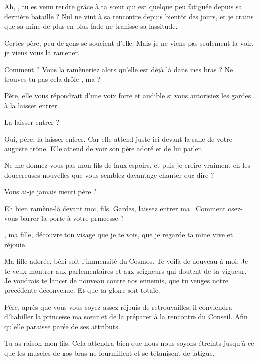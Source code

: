 \begin{drama}

  \roispeaks Ah, \elena, tu es venu rendre grâce à ta sœur qui est quelque peu fatiguée depuis sa dernière bataille ? Nul ne vint à sa rencontre depuis bientôt des jours, et je crains que sa mine de plus en plus fade ne trahisse sa lassitude.

  \elenaspeaks Certes père, peu de gens se soucient d’elle. Mais je ne viens pas seulement la voir, je viens vous la ramener.

  \roispeaks Comment ? Vous la ramèneriez alors qu’elle est déjà là dans mes bras  ?  Ne trouves-tu pas cela drôle \princesse{}, ma \princesse{} ?

  \elenaspeaks Père, elle vous répondrait d’une voix forte et audible si vous autorisiez les gardes à la laisser entrer.

  \elenaspeaks La laisser entrer ?

  \elenaspeaks Oui, père, la laisser entrer. Car elle attend juste ici devant la salle de votre auguste trône. Elle attend de voir son père adoré et de lui parler.


  \roispeaks Ne me donnez-vous pas mon fils de faux espoirs, et puis-je croire vraiment en les doucereuses nouvelles que vous semblez davantage chanter que dire ?

  \elenaspeaks Vous ai-je jamais menti père ?

  \roispeaks Eh bien ramène-là devant moi, fils. Gardes, laissez entrer ma \princesse. Comment osez-vous  barrer la porte à votre princesse ?


  \princesse, ma fille, découvre ton visage que je te vois, que je regarde ta mine vive et réjouie.


   Ma fille adorée, béni soit l’immensité du Cosmos. Te voilà de nouveau à moi. Je te veux montrer aux parlementaires et aux seigneurs qui doutent de ta vigueur. Je voudrais te lancer de nouveau contre nos ennemis, que tu venges notre précédente déconvenue. Et que ta gloire soit totale.

  \elenaspeaks Père, après que vous vous soyez assez réjouis de retrouvailles, il conviendra d’habiller la princesse ma sœur et de la préparer à la rencontre du Conseil. Afin qu’elle paraisse parée de ses attributs.

  \roispeaks Tu as raison mon fils. Cela attendra bien que nous nous soyons étreints jusqu’à ce que les muscles de nos bras ne fourmillent et se tétanisent de fatigue.

\end{drama}

